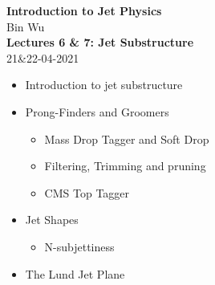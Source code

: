 \documentclass[9pt,a4paper,unknownkeysallowed,xcolor=dvipsnames,aspectratio=43]{beamer}
\begin{document}
\begin{frame}
\vspace*{\fill}
\begin{center}
{\Huge\bf\color{darkred} Introduction to Jet Physics}\\
\vspace{4mm}
    Bin Wu\\
    \vspace{8mm}
    {\bf\Large Lectures 6 \& 7: Jet Substructure}\\\vspace{4mm}
    {\color{darkblue} 21\&22-04-2021}
\end{center}
\vspace{4mm}
\begin{itemize}
    \item[\color{darkred}\Large\bullet] Introduction to jet substructure
    \vspace{2mm}
    \item[\color{darkred}\Large\bullet] Prong-Finders and Groomers
    \vspace{2mm}
    \begin{itemize}
        \item[\diamondsuit] Mass Drop Tagger and Soft Drop
        \vspace{2mm}
        \item[\diamondsuit] Filtering, Trimming and pruning 
        \vspace{2mm}
        \item[\diamondsuit] CMS Top Tagger
    \end{itemize}
    \vspace{2mm}
    \item[\color{darkred}\Large\bullet] Jet Shapes
    \vspace{2mm}
    \begin{itemize}
        \item[\diamondsuit] N-subjettiness
    \end{itemize}
    \vspace{2mm}
    \item[\color{darkred}\Large\bullet] The Lund Jet Plane
    
\end{itemize}
\vspace*{\fill}
\end{frame}
%
%
\end{document}
